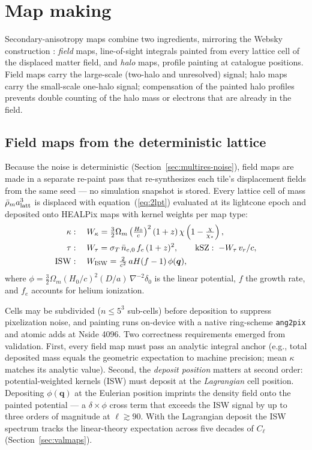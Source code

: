 \section{Map making}
\label{sec:maps}

Secondary-anisotropy maps combine two ingredients, mirroring the Websky
construction \citep{Stein2020}: \emph{field} maps, line-of-sight integrals
painted from every lattice cell of the displaced matter field, and
\emph{halo} maps, profile painting at catalogue positions. Field maps carry
the large-scale (two-halo and unresolved) signal; halo maps carry the
small-scale one-halo signal; compensation of the painted halo profiles
prevents double counting of the halo mass or electrons that are already in
the field.

\subsection{Field maps from the deterministic lattice}
\label{sec:maps-field}

Because the noise is deterministic (Section~\ref{sec:multires-noise}), field
maps are made in a separate re-paint pass that re-synthesizes each tile's
displacement fields from the same seed --- no simulation snapshot is stored.
Every lattice cell of mass $\bar\rho_m a_{\rm latt}^3$ is displaced with
equation~(\ref{eq:2lpt}) evaluated at its lightcone epoch and deposited onto
HEALPix maps \citep{Gorski2005} with kernel weights per map type:
\begin{align}
  \kappa &: \quad
  W_\kappa = \tfrac{3}{2}\Omega_m \left(\tfrac{H_0}{c}\right)^2
  (1+z)\,\chi\left(1-\tfrac{\chi}{\chi_\star}\right), \\
  \tau &: \quad
  W_\tau = \sigma_T\,\bar n_{e,0}\,f_e\,(1+z)^2 , \qquad
  {\rm kSZ}: \; -W_\tau\, v_r/c , \\
  {\rm ISW} &: \quad
  W_{\rm ISW} = \tfrac{2}{c^2}\, a H (f-1)\, \phi(\bm{q}) ,
\end{align}
where $\phi = \tfrac{3}{2}\Omega_m (H_0/c)^2 (D/a)\, \nabla^{-2}\delta_0$ is
the linear potential, $f$ the growth rate, and $f_e$ accounts for helium
ionization. 

Cells may be subdivided ($n\le 5^3$ sub-cells) before deposition to suppress
pixelization noise, and painting runs on-device with a native ring-scheme
\texttt{ang2pix} and atomic adds at Nside 4096. Two correctness requirements
emerged from validation. First, every field map must pass an analytic
integral anchor (e.g., total deposited mass equals the geometric expectation
to machine precision; mean $\kappa$ matches its analytic value). Second, the
\emph{deposit position} matters at second order: potential-weighted kernels
(ISW) must deposit at the \emph{Lagrangian} cell position. Depositing
$\phi(\bm{q})$ at the Eulerian position imprints the density field onto the
painted potential --- a $\delta\times\phi$ cross term that exceeds the ISW
signal by up to three orders of magnitude at $\ell\gtrsim 90$. With the
Lagrangian deposit the ISW spectrum tracks the linear-theory expectation
across five decades of $C_\ell$ (Section~\ref{sec:valmaps}).

